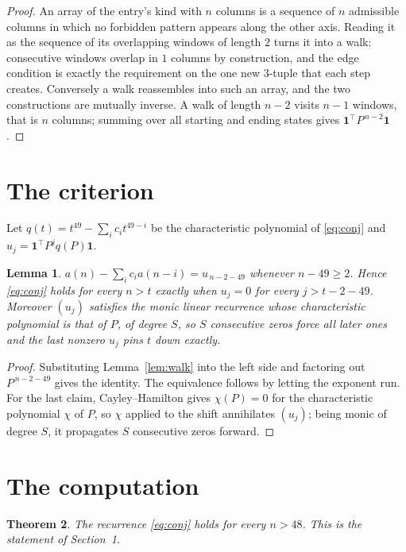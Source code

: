\documentclass[11pt,a4paper]{article}
\theoremstyle{plain}
\newtheorem{theorem}{Theorem}
\newtheorem{lemma}[theorem]{Lemma}
\theoremstyle{definition}
\begin{document}
\begin{proof}
An array of the entry's kind with $n$ columns is a sequence of $n$ admissible columns in
which no forbidden pattern appears along the other axis. Reading it as the sequence of its
overlapping windows of length $2$ turns it into a walk: consecutive windows overlap in
$1$ columns by construction, and the edge condition is exactly the requirement on the one
new $3$-tuple that each step creates. Conversely a walk reassembles into such an array,
and the two constructions are mutually inverse. A walk of length $n-2$ visits $n-1$
windows, that is $n$ columns; summing over all starting and ending states gives
$\mathbf{1}^{\!\top}P^{\,n-2}\mathbf{1}$.
\end{proof}

\section{The criterion}

Let $q(t)=t^{49}-\sum_i c_i t^{49-i}$ be the characteristic polynomial of
\eqref{eq:conj} and $u_j=\mathbf{1}^{\!\top}P^{j}q(P)\mathbf{1}$.

\begin{lemma}\label{lem:crit}
$a(n)-\sum_i c_i a(n-i)=u_{\,n-2-49}$ whenever $n-49\ge2$. Hence
\eqref{eq:conj} holds for every $n>t$ exactly when $u_j=0$ for every
$j>t-2-49$. Moreover $(u_j)$ satisfies the monic linear recurrence whose
characteristic polynomial is that of $P$, of degree $S$, so $S$ consecutive zeros force all
later ones and the last nonzero $u_j$ pins $t$ down exactly.
\end{lemma}

\begin{proof}
Substituting Lemma~\ref{lem:walk} into the left side and factoring out
$P^{\,n-2-49}$ gives the identity. The equivalence follows by letting the exponent
run. For the last claim, Cayley--Hamilton gives $\chi(P)=0$ for the characteristic
polynomial $\chi$ of $P$, so $\chi$ applied to the shift annihilates $(u_j)$; being monic of
degree $S$, it propagates $S$ consecutive zeros forward.
\end{proof}

\section{The computation}

\begin{theorem}
The recurrence \eqref{eq:conj} holds for every $n>48$. This is the statement of
Section~1.
\end{theorem}
\end{document}
